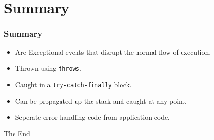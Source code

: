 \documentclass{beamer}
\begin{document}
\section{Summary}
\begin{frame}
\frametitle{Summary}
\begin{itemize}
\item Are Exceptional events that disrupt the normal flow of execution.
\item Thrown using \texttt{throws}.
\item Caught in a \texttt{try-catch-finally} block.
\item Can be propagated up the stack and caught at any point.
\item Seperate error-handling code from application code.
\end{itemize}
\end{frame}


\begin{frame} 
\Huge{\centerline{The End}}
\end{frame}
\end{document}

